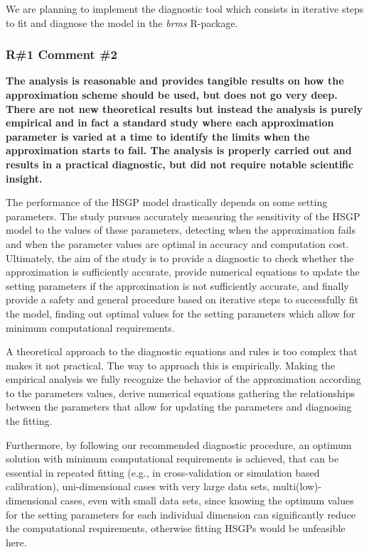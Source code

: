 \documentclass[11pt]{report}
\begin{document}
We are planning to implement the diagnostic tool which consists in iterative steps to fit and diagnose the model in the \textit{brms} R-package.
 

\subsubsection*{R\#1 Comment \#2}

\textbf{The analysis is reasonable and provides tangible results on how the approximation scheme should be used, but does not go very deep. There are not new theoretical results but instead the analysis is purely empirical and in fact a standard study where each approximation parameter is varied at a time to identify the limits when the approximation starts to fail. The analysis is properly carried out and results in a practical diagnostic, but did not require notable scientific insight.}

The performance of the HSGP model drastically depends on some setting parameters. The study pursues accurately measuring the sensitivity of the HSGP model to the values of these parameters, detecting when the approximation fails and when the parameter values are optimal in accuracy and computation cost. Ultimately, the aim of the study is to provide a diagnostic to check whether the approximation is sufficiently accurate, provide numerical equations to update the setting parameters if the approximation is not sufficiently accurate, and finally provide a safety and general procedure based on iterative steps to successfully fit the model, finding out optimal values for the setting parameters which allow for minimum computational requirements.

A theoretical approach to the diagnostic equations and rules is too complex that makes it not practical. The way to approach this is empirically. Making the empirical analysis we fully recognize the behavior of the approximation according to the parameters values, derive numerical equations gathering the relationships between the parameters that allow for updating the parameters and diagnosing the fitting.

Furthermore, by following our recommended diagnostic procedure, an optimum solution with minimum computational requirements is achieved, that can be essential in repeated fitting (e.g., in cross-validation or simulation based calibration), uni-dimensional cases with very large data sets, multi(low)-dimensional cases, even with small data sets, since knowing the optimum values for the setting parameters for each individual dimension can significantly reduce the computational requirements, otherwise fitting HSGPs would be unfeasible here.
\end{document}
